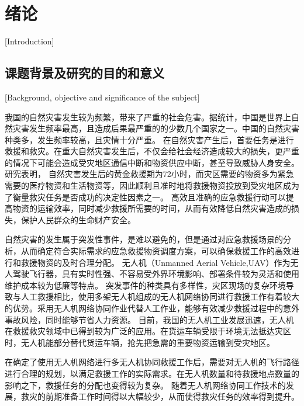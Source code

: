 
\chapter{绪论}[Introduction]

\section{课题背景及研究的目的和意义}[Background, objective and significance of the subject]

我国的自然灾害发生较为频繁，带来了严重的社会危害。据统计，中国是世界上自然灾害发生频率最高，且造成后果最严重的的少数几个国家之一\cite{ziranzaihaifangzhide}。中国的自然灾害种类多，发生频率较高，且灾情十分严重。
在自然灾害产生后，首要任务是进行救援和救灾。在重大自然灾害发生后，不仅会给社会经济造成较大的损失，更严重的情况下可能会造成受灾地区通信中断和物资供应中断，甚至导致威胁人身安全。研究表明，
自然灾害发生后的黄金救援期为72小时，而灾区需要的物资多为紧急需要的医疗物资和生活物资等，因此顺利且准时地将救援物资投放到受灾地区成为了衡量救灾任务是否成功的决定性因素之一\cite{yuqingqing}。
高效且准确的应急救援行动可以提高物资的运输效率，同时减少救援所需要的时间，从而有效降低自然灾害造成的损失，保护人民群众的生命财产安全。


自然灾害的发生属于突发性事件，是难以避免的，但是通过对应急救援场景的分析，从而确定符合实际需求的应急救援物资调度方案，可以确保救援工作的高效进行和救援物资的及时合理分配。
无人机（Unmanned Aerial Vehicle,UAV）作为无人驾驶飞行器，具有实时性强、不容易受外界环境影响、部署条件较为灵活和使用维护成本较为低廉等特点。
突发事件的种类具有多样性，灾区现场的复杂环境导致与人工救援相比，使用多架无人机组成的无人机网络协同进行救援工作有着较大的优势。采用无人机网络协同作业代替人工作业，能够有效减少救援过程中的意外事故风险，同时能够节省人力资源。
目前，我国的无人机工业发展迅速，无人机在救援救灾领域中已得到较为广泛的应用。在货运车辆受限于环境无法抵达灾区时，无人机能部分替代货运车辆，抢先把急需的重要物资运输到受灾地区\cite{liuyajing}。


在确定了使用无人机网络进行多无人机协同救援工作后，需要对无人机的飞行路径进行合理的规划，以满足救援工作的实际需求。在无人机数量和待救援地点数量的影响之下，救援任务的分配也变得较为复杂。
随着无人机网络协同工作技术的发展，救灾的前期准备工作时间得以大幅较少，从而使得救灾任务的效率得到提升。


